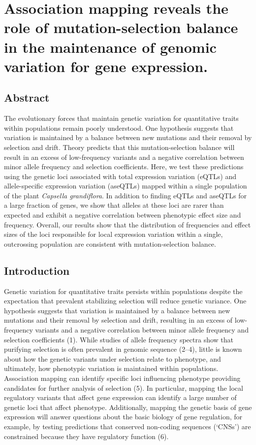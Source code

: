 \chapter{Association mapping reveals the role of mutation-selection balance in the maintenance of genomic variation for gene expression.}

\section{Abstract}
The evolutionary forces that maintain genetic variation for quantitative traits within populations remain poorly understood. One hypothesis suggests that variation is maintained by a balance between new mutations and their removal by selection and drift. Theory predicts that this mutation-selection balance will result in an excess of low-frequency variants and a negative correlation between minor allele frequency and selection coefficients. Here, we test these predictions using the genetic loci associated with total expression variation (eQTLs) and allele-specific expression variation (aseQTLs) mapped within a single population of the plant \textit{Capsella grandiflora}. In addition to finding eQTLs and aseQTLs for a large fraction of genes, we show that alleles at these loci are rarer than expected and exhibit a negative correlation between phenotypic effect size and frequency. Overall, our results show that the distribution of frequencies and effect sizes of the loci responsible for local expression variation within a single, outcrossing population are consistent with mutation-selection balance.

\section{Introduction}
Genetic variation for quantitative traits persists within populations despite the expectation that prevalent stabilizing selection will reduce genetic variance. One hypothesis suggests that variation is maintained by a balance between new mutations and their removal by selection and drift, resulting in an excess of low-frequency variants and a negative correlation between minor allele frequency and selection coefficients (1). While studies of allele frequency spectra show that purifying selection is often prevalent in genomic sequence (2–4), little is known about how the genetic variants under selection relate to phenotype, and ultimately, how phenotypic variation is maintained within populations. Association mapping can identify specific loci influencing phenotype providing candidates for further analysis of selection (5). In particular, mapping the local regulatory variants that affect gene expression can identify a large number of genetic loci that affect phenotype. Additionally, mapping the genetic basis of gene expression will answer questions about the basic biology of gene regulation, for example, by testing predictions that conserved non-coding sequences (‘CNSs’) are constrained because they have regulatory function (6).

